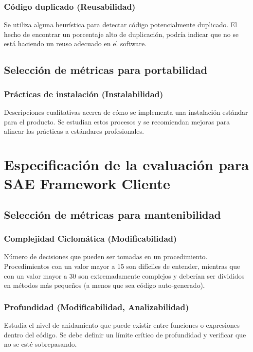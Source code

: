 \subsubsection{Código duplicado (Reusabilidad)}

Se utiliza alguna heurística para detectar código potencialmente duplicado.
El hecho de encontrar un porcentaje alto de duplicación, podría indicar que no se está haciendo un reuso 
adecuado en el software.

\subsection{Selección de métricas para portabilidad}

\subsubsection{Prácticas de instalación (Instalabilidad)}

Descripciones cualitativas acerca de cómo se implementa una instalación estándar para el producto. 
Se estudian estos procesos y se recomiendan mejoras para alinear las prácticas a estándares profesionales.

\section{Especificación de la evaluación para SAE Framework Cliente}
\subsection{Selección de métricas para mantenibilidad}
\subsubsection{Complejidad Ciclomática (Modificabilidad)}
Número de decisiones que pueden ser tomadas en un procedimiento.
Procedimientos con un valor mayor a 15 son difíciles de entender, mientras que con un valor mayor a 
30 son extremadamente complejos y deberían ser divididos en métodos más pequeños (a menos que sea 
código auto-generado).

\subsubsection{Profundidad (Modificabilidad, Analizabilidad)}
Estudia el nivel de anidamiento que puede existir entre funciones o expresiones dentro del código. 
Se debe definir un límite crítico de profundidad y verificar que no se esté sobrepasando.

